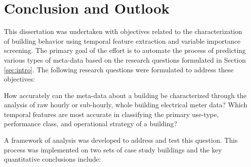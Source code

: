 \chapter{Conclusion and Outlook}
\label{sec:conclusion}

This dissertation was undertaken with objectives related to the characterization of building behavior using temporal feature extraction and variable importance screening. The primary goal of the effort is to automate the process of predicting various types of meta-data based on the research questions formulated in Section \ref{sec:intro}. The following research questions were formulated to address these objectives:

\begin{center}
How accurately can the meta-data about a building be characterized through the analysis of raw hourly or sub-hourly, whole building electrical meter data? Which temporal features are most accurate in classifying the primary use-type, performance class, and operational strategy of a building?
\end{center}

A framework of analysis was developed to address and test this question. This process was implemented on two sets of case study buildings and the key quantitative conclusions include: 

